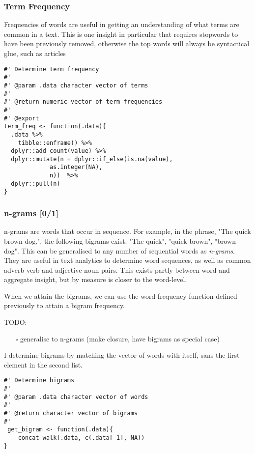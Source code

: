 \documentclass[a4paper, 11pt]{article}
\begin{document}
\subsubsection{Term Frequency}
\label{sec:org9c439c5}
Frequencies of words are useful in getting an understanding of what
terms are common in a text. This is one insight in particular that
requires stopwords to have been previously removed, otherwise the top
words will always be syntactical glue, such as articles
\begin{verbatim}
#' Determine term frequency
#'
#' @param .data character vector of terms
#'
#' @return numeric vector of term frequencies
#'
#' @export
term_freq <- function(.data){
  .data %>%
    tibble::enframe() %>%
  dplyr::add_count(value) %>%
  dplyr::mutate(n = dplyr::if_else(is.na(value),
		     as.integer(NA),
		     n))  %>%
  dplyr::pull(n)
}
\end{verbatim}
\subsubsection{n-grams [0/1]}
\label{sec:org6c876c4}
n-grams are words that occur in sequence. For example, in the
phrase, "The quick brown dog.", the following bigrams exist: "The
quick", "quick brown", "brown dog". This can be generalised to any
number of sequential words as \emph{n-grams}. They are useful in text
analytics to determine word sequences, as well as common adverb-verb
and adjective-noun pairs. This exists partly between word and
aggregate insight, but by measure is closer to the word-level.

When we attain the bigrams, we can use the word frequency function
defined previously to attain a bigram frequency.

TODO:
\begin{itemize}
\item[{$\square$}] generalise to n-grams (make closure, have bigrams as special
case)
\end{itemize}

I determine bigrams by matching the vector of words with itself, sans
the first element in the second list.
\begin{verbatim}
#' Determine bigrams
#'
#' @param .data character vector of words
#'
#' @return character vector of bigrams
#'
 get_bigram <- function(.data){
    concat_walk(.data, c(.data[-1], NA))
}
\end{verbatim}
\end{document}
